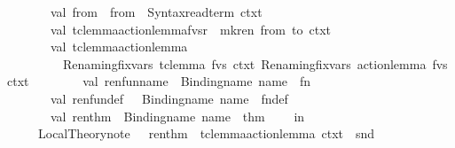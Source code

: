 \begin{isabellebody}
\ \ \ \ \ \ \ \ val\ from\ {\isacharequal}{\kern0pt}\ from\ {\isacharbar}{\kern0pt}{\isachargreater}{\kern0pt}\ Syntax{\isachardot}{\kern0pt}read{\isacharunderscore}{\kern0pt}term\ ctxt\isanewline
\ \ \ \ \ \ \ \ val\ {\isacharparenleft}{\kern0pt}tc{\isacharunderscore}{\kern0pt}lemma{\isacharcomma}{\kern0pt}action{\isacharunderscore}{\kern0pt}lemma{\isacharcomma}{\kern0pt}fvs{\isacharcomma}{\kern0pt}r{\isacharparenright}{\kern0pt}\ {\isacharequal}{\kern0pt}\ mk{\isacharunderscore}{\kern0pt}ren\ from\ to\ ctxt\isanewline
\ \ \ \ \ \ \ \ val\ {\isacharparenleft}{\kern0pt}tc{\isacharunderscore}{\kern0pt}lemma{\isacharcomma}{\kern0pt}action{\isacharunderscore}{\kern0pt}lemma{\isacharparenright}{\kern0pt}\ {\isacharequal}{\kern0pt}\isanewline
\ \ \ \ \ \ \ \ \ \ {\isacharparenleft}{\kern0pt}Renaming{\isachardot}{\kern0pt}fix{\isacharunderscore}{\kern0pt}vars\ tc{\isacharunderscore}{\kern0pt}lemma\ fvs\ ctxt{\isacharcomma}{\kern0pt}\ Renaming{\isachardot}{\kern0pt}fix{\isacharunderscore}{\kern0pt}vars\ action{\isacharunderscore}{\kern0pt}lemma\ fvs\ ctxt{\isacharparenright}{\kern0pt}\isanewline
\ \ \ \ \ \ \ \ val\ ren{\isacharunderscore}{\kern0pt}fun{\isacharunderscore}{\kern0pt}name\ {\isacharequal}{\kern0pt}\ Binding{\isachardot}{\kern0pt}name\ {\isacharparenleft}{\kern0pt}name\ {\isacharcircum}{\kern0pt}\ {\isachardoublequote}{\kern0pt}{\isacharunderscore}{\kern0pt}fn{\isachardoublequote}{\kern0pt}{\isacharparenright}{\kern0pt}\isanewline
\ \ \ \ \ \ \ \ val\ ren{\isacharunderscore}{\kern0pt}fun{\isacharunderscore}{\kern0pt}def\ {\isacharequal}{\kern0pt}\ \ Binding{\isachardot}{\kern0pt}name\ {\isacharparenleft}{\kern0pt}name\ {\isacharcircum}{\kern0pt}\ {\isachardoublequote}{\kern0pt}{\isacharunderscore}{\kern0pt}fn{\isacharunderscore}{\kern0pt}def{\isachardoublequote}{\kern0pt}{\isacharparenright}{\kern0pt}\isanewline
\ \ \ \ \ \ \ \ val\ ren{\isacharunderscore}{\kern0pt}thm\ {\isacharequal}{\kern0pt}\ Binding{\isachardot}{\kern0pt}name\ {\isacharparenleft}{\kern0pt}name\ {\isacharcircum}{\kern0pt}\ {\isachardoublequote}{\kern0pt}{\isacharunderscore}{\kern0pt}thm{\isachardoublequote}{\kern0pt}{\isacharparenright}{\kern0pt}\isanewline
\ \ \ \ in\isanewline
\ \ \ \ \ \ Local{\isacharunderscore}{\kern0pt}Theory{\isachardot}{\kern0pt}note\ \ \ {\isacharparenleft}{\kern0pt}{\isacharparenleft}{\kern0pt}ren{\isacharunderscore}{\kern0pt}thm{\isacharcomma}{\kern0pt}\ {\isacharbrackleft}{\kern0pt}{\isacharbrackright}{\kern0pt}{\isacharparenright}{\kern0pt}{\isacharcomma}{\kern0pt}\ {\isacharbrackleft}{\kern0pt}tc{\isacharunderscore}{\kern0pt}lemma{\isacharcomma}{\kern0pt}action{\isacharunderscore}{\kern0pt}lemma{\isacharbrackright}{\kern0pt}{\isacharparenright}{\kern0pt}\ ctxt\ {\isacharbar}{\kern0pt}{\isachargreater}{\kern0pt}\ snd\ {\isacharbar}{\kern0pt}{\isachargreater}{\kern0pt}\isanewline

\end{isabellebody}
